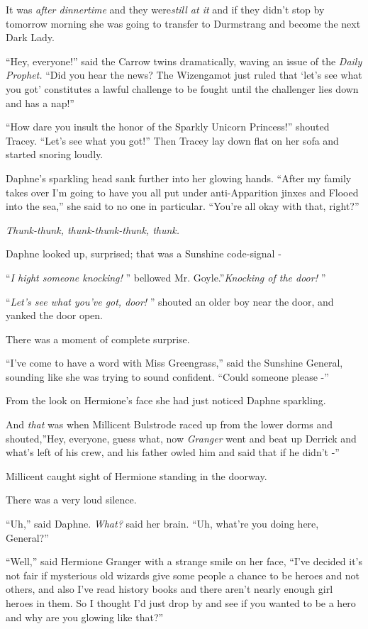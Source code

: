 It was \emph{after dinnertime} and they were\emph{still at it} and if
they didn't stop by tomorrow morning she was going to transfer to
Durmstrang and become the next Dark Lady.

``Hey, everyone!'' said the Carrow twins dramatically, waving an issue
of the \emph{Daily Prophet.} ``Did you hear the news? The Wizengamot
just ruled that `let's see what you got' constitutes a lawful challenge
to be fought until the challenger lies down and has a nap!''

``How dare you insult the honor of the Sparkly Unicorn Princess!''
shouted Tracey. ``Let's see what you got!'' Then Tracey lay down flat on
her sofa and started snoring loudly.

Daphne's sparkling head sank further into her glowing hands. ``After my
family takes over I'm going to have you all put under anti-Apparition
jinxes and Flooed into the sea,'' she said to no one in particular.
``You're all okay with that, right?''

\emph{Thunk-thunk, thunk-thunk-thunk, thunk.}

Daphne looked up, surprised; that was a Sunshine code-signal -

``\emph{I hight someone knocking!} '' bellowed Mr. Goyle.''\emph{Knocking
of the door!} ''

``\emph{Let's see what you've got, door!} '' shouted an older boy near the
door, and yanked the door open.

There was a moment of complete surprise.

``I've come to have a word with Miss Greengrass,'' said the Sunshine
General, sounding like she was trying to sound confident. ``Could
someone please -''

From the look on Hermione's face she had just noticed Daphne sparkling.

And \emph{that} was when Millicent Bulstrode raced up from the lower
dorms and shouted,''Hey, everyone, guess what, now \emph{Granger} went
and beat up Derrick and what's left of his crew, and his father owled
him and said that if he didn't -''

Millicent caught sight of Hermione standing in the doorway.

There was a very loud silence.

``Uh,'' said Daphne. \emph{What?} said her brain. ``Uh, what're you
doing here, General?''

``Well,'' said Hermione Granger with a strange smile on her face, ``I've
decided it's not fair if mysterious old wizards give some people a
chance to be heroes and not others, and also I've read history books and
there aren't nearly enough girl heroes in them. So I thought I'd just
drop by and see if you wanted to be a hero and why are you glowing like
that?''

